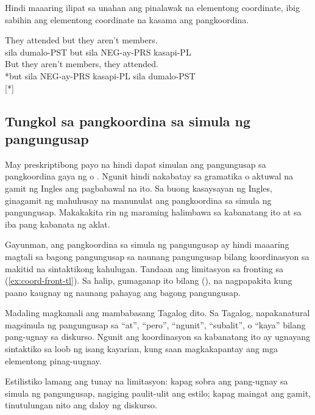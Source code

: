 Hindi maaaring ilipat sa unahan ang pinalawak na elementong coordinate, ibig sabihin ang elementong coordinate na kasama ang pangkoordina.

\ea \label{ex:coord-front-tl}
    \ea \gll They attended but they aren't members.\\
        sila dumalo-PST but sila NEG-ay-PRS kasapi-PL\\
    \glt {}
    \ex \gll *But they aren't members, they attended.\\
        *but sila NEG-ay-PRS kasapi-PL sila dumalo-PST\\
    \glt {} [*]
    \z
\z

\subsection{Tungkol sa pangkoordina sa simula ng pangungusap}

May preskriptibong payo na hindi dapat simulan ang pangungusap sa pangkoordina gaya ng  o . Ngunit hindi nakabatay sa gramatika o aktuwal na gamit ng Ingles ang pagbabawal na ito. Sa buong kasaysayan ng Ingles, ginagamit ng mahuhusay na manunulat ang pangkoordina sa simula ng pangungusap. Makakakita rin ng maraming halimbawa sa kabanatang ito at sa iba pang kabanata ng aklat.

Gayunman, ang pangkoordina sa simula ng pangungusap ay hindi maaaring magtali sa bagong pangungusap sa naunang pangungusap bilang koordinasyon sa makitid na sintaktikong kahulugan. Tandaan ang limitasyon sa fronting sa (\ref{ex:coord-front-tl}). Sa halip, gumaganap ito bilang  (), na nagpapakita kung paano kaugnay ng naunang pahayag ang bagong pangungusap.

Madaling magkamali ang mambabasang Tagalog dito. Sa Tagalog, napakanatural magsimula ng pangungusap sa \enquote{at}, \enquote{pero}, \enquote{ngunit}, \enquote{subalit}, o \enquote{kaya} bilang pang-ugnay sa diskurso. Ngunit ang koordinasyon sa kabanatang ito ay ugnayang sintaktiko sa loob ng isang kayarian, kung saan magkakapantay ang mga elementong pinag-uugnay.

Estilistiko lamang ang tunay na limitasyon: kapag sobra ang pang-ugnay sa simula ng pangungusap, nagiging paulit-ulit ang estilo; kapag maingat ang gamit, tinutulungan nito ang daloy ng diskurso.

